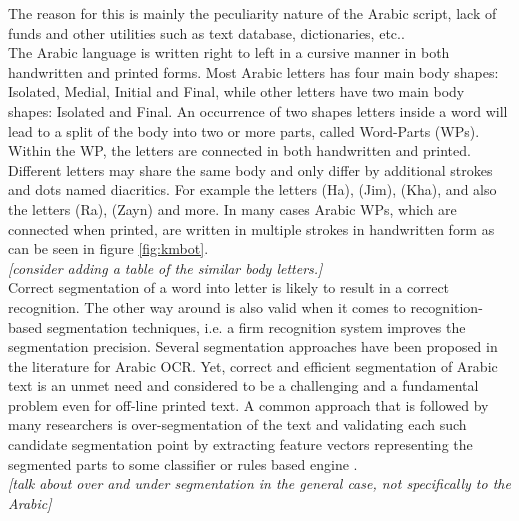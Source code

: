 \documentclass[journal,compsoc]{IEEEtran}
\begin{document}
The reason for this is mainly the peculiarity nature of the Arabic script, lack of funds and other utilities such as text database, dictionaries, etc.\cite{zeki2011segmentation}.\\

The Arabic language is written right to left in a cursive manner in both handwritten and printed forms. Most Arabic letters has four main body shapes: Isolated, Medial, Initial and Final, while other letters have two main body shapes: Isolated and Final. An occurrence of two shapes letters inside a word will lead to a split of the body into two or more parts, called Word-Parts (WPs). Within the WP, the letters are connected in both handwritten and printed. Different letters may share the same body and only differ by additional strokes and dots named diacritics. For example the letters   (Ha), (Jim), (Kha), and also the letters  (Ra), (Zayn) and more.
In many cases Arabic WPs, which are connected when printed, are written in multiple strokes in handwritten form as can be seen in figure \ref{fig:kmbot}. \\

\emph{[consider adding a table of the similar body letters.]}\\

Correct segmentation of a word into letter is likely to result in a correct recognition. The other way around is also valid when it comes to recognition-based segmentation techniques, i.e. a firm recognition system improves the segmentation precision. Several segmentation approaches have been proposed in the literature for Arabic OCR. Yet, correct and efficient segmentation of Arabic text is an unmet need and considered to be a challenging and a fundamental problem even for off-line printed text. A common approach that is followed by many researchers is over-segmentation of the text and validating each such candidate segmentation point by extracting feature vectors representing the segmented parts to some classifier or rules based engine \cite{daifallah2009recognition}.\\

\emph{[talk about over and under segmentation in the general case, not specifically to the Arabic]}\\
\end{document}
